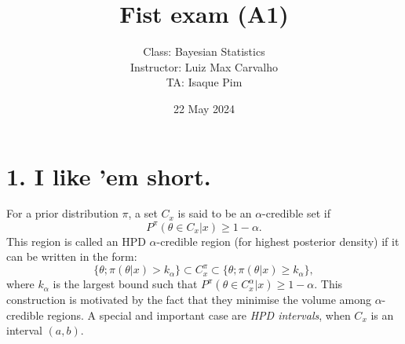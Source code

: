 \documentclass[a4paper,10pt, notitlepage]{report}
\title{Fist exam (A1)}
\author{Class: Bayesian Statistics \\ Instructor: Luiz Max Carvalho \\ TA: Isaque Pim}
\date{22 May 2024}
\begin{document}
\maketitle

\begin{center}
\end{center}

\newpage

\section*{1. I like 'em short.}

For a prior distribution $\pi$, a set $C_x$ is said to be an
$\alpha$-credible set if $$P^\pi (\theta \in C_x |x) \geq 1-\alpha.$$
This region is called an HPD $\alpha$-credible region (for highest posterior density) if it can be written in the form:
\begin{equation*}
    \{\theta; \pi(\theta|x) > k_{\alpha}\} \subset C_x^\pi \subset \{\theta; \pi(\theta|x) \geq k_{\alpha}\},
\end{equation*}
where $k_{\alpha}$ is the largest bound such that
$P^\pi (\theta \in C_x^\alpha |x) \geq 1-\alpha$.
This construction is motivated by the fact that they minimise the volume among $\alpha$-credible regions.
A special and important case are \textit{HPD intervals}, when $C_x$ is an interval $(a, b)$. 
\end{document}
